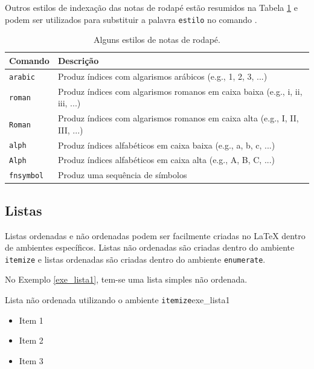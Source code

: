 Outros estilos de indexação das notas de rodapé estão resumidos na Tabela \ref{tab:estilos_notas_rodape} e podem ser utilizados para substituir a palavra {\tt estilo} no comando \texttt{\renewcommand{\thefootnote}{\estilo{footnote}}}.

\begin{table}[H]
\centering
\caption{Alguns estilos de notas de rodapé.}
\label{tab:estilos_notas_rodape}
  \begin{tabular}{p{2cm}p{12cm}}
	  \toprule
    \textbf{Comando} & \textbf{Descrição} \\
  	\midrule
    {\tt arabic}   & Produz índices com algarismos arábicos (e.g., 1, 2, 3, ...) \\
    {\tt roman}    & Produz índices com algarismos romanos em caixa baixa (e.g., i, ii, iii, ...) \\
    {\tt Roman}    & Produz índices com algarismos romanos em caixa alta (e.g., I, II, III, ...) \\
    {\tt alph}     & Produz índices alfabéticos em caixa baixa (e.g., a, b, c, ...) \\
    {\tt Alph}     & Produz índices alfabéticos em caixa alta (e.g., A, B, C, ...) \\
    {\tt fnsymbol} & Produz uma sequência de símbolos \\
    \bottomrule
  \end{tabular}
\end{table}

\subsection{Listas}
\label{sec:listas}

Listas ordenadas e não ordenadas podem ser facilmente criadas no \LaTeX{} dentro de ambientes específicos. Listas não ordenadas são criadas dentro do ambiente \texttt{itemize} e listas ordenadas são criadas dentro do ambiente \texttt{enumerate}.

No Exemplo \ref{exe_lista1}, tem-se uma lista simples não ordenada.

\begin{texexptitled}[breakable,enhanced,middle=2mm]{Lista não ordenada utilizando o ambiente \texttt{itemize}}{exe_lista1}
\begin{itemize}
    \item Item 1
    \item Item 2
    \item Item 3
\end{itemize}
\end{texexptitled}

